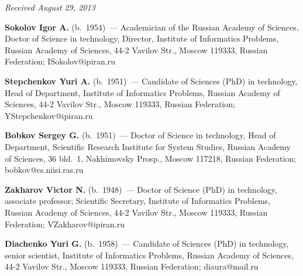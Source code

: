 \begin{multicols}{2}
{{\begin{thebibliography}{99}
{}


\end{thebibliography}
} }


\end{multicols}

\vspace*{-6pt}

\hfill{\small\textit{Received August 29, 2013}}

\vspace*{-18pt}

\Contr


\noindent
\textbf{Sokolov Igor A.} (b.\ 1954)~--- Academician of the Russian Academy of Sciences,  
Doctor of Science in technology, Director,  
Institute of Informatics Problems, Russian Academy of Sciences, 44-2 Vavilov Str., 
Moscow 119333, Russian Federation;  ISokolov@ipiran.ru



\vspace*{2pt}

\noindent
\textbf{Stepchenkov Yuri A.} (b.\ 1951)~--- Candidate of Sciences (PhD) in technology, 
Head of Department, Institute of Informatics Problems, Russian Academy of Sciences,
44-2 Vavilov Str., Moscow 119333, Russian Federation;    YStepchenkov@ipiran.ru

\vspace*{2pt}


\noindent
\textbf{Bobkov Sergey G.} (b.\ 1951)~--- Doctor of Science in technology, Head of Department, 
Scientific Research Institute for System Studies, Russian Academy of Sciences,
36 bld.~1, Nakhimovsky Prosp.,
Moscow 117218, Russian Federation;  bobkov@cs.niisi.ras.ru

\vspace*{2pt}

\noindent
\textbf{Zakharov Victor N.}  (b.\ 1948)~--- Doctor of Science (PhD) in technology, 
associate professor; Scientific Secretary, Institute of Informatics Problems, 
Russian Academy of Sciences, 44-2 Vavilov Str.,
Moscow 119333, Russian Federation;  VZakharov@ipiran.ru 

\vspace*{2pt}


\noindent
\textbf{Diachenko Yuri G.} (b.\ 1958)~--- Candidate of  Sciences (PhD) in technology, senior 
scientist, Institute of Informatics Problems, 
Russian Academy of Sciences, 44-2 Vavilov Str.,
Moscow 119333, Russian Federation; diaura@mail.ru

\vspace*{2pt}

